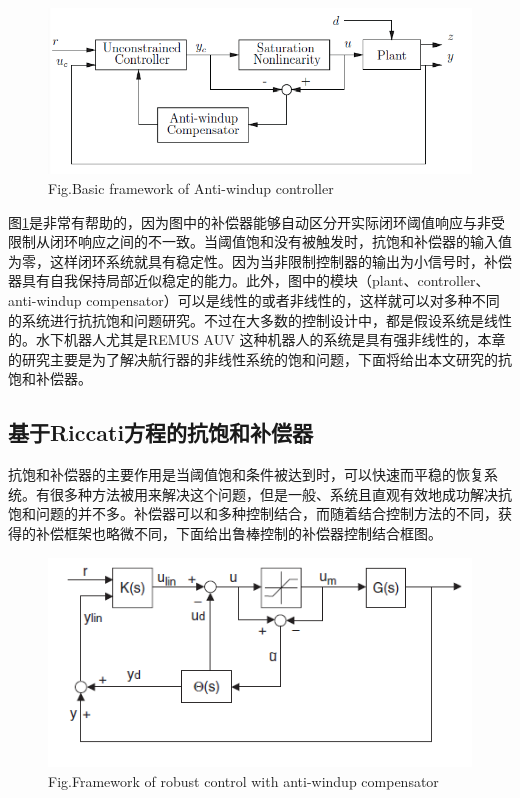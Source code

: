 \begin{figure}[!htp]
\centering
 \includegraphics[width=14cm]{figure/chap6/basic_anti-windup.png}
 \label{fig:chap6:F2}
  {Fig.}{Basic framework of Anti-windup controller}
\end{figure}

图\ref{fig:chap6:F2}是非常有帮助的，因为图中的补偿器能够自动区分开实际闭环阈值响应与非受限制从闭环响应之间的不一致。当阈值饱和没有被触发时，抗饱和补偿器的输入值为零，这样闭环系统就具有稳定性。因为当非限制控制器的输出为小信号时，补偿器具有自我保持局部近似稳定的能力。此外，图中的模块（plant、controller、anti-windup compensator）可以是线性的或者非线性的，这样就可以对多种不同的系统进行抗抗饱和问题研究。不过在大多数的控制设计中，都是假设系统是线性的。水下机器人尤其是REMUS AUV 这种机器人的系统是具有强非线性的，本章的研究主要是为了解决航行器的非线性系统的饱和问题，下面将给出本文研究的抗饱和补偿器。



\subsection{基于Riccati方程的抗饱和补偿器 }

抗饱和补偿器的主要作用是当阈值饱和条件被达到时，可以快速而平稳的恢复系统。有很多种方法被用来解决这个问题，但是一般、系统且直观有效地成功解决抗饱和问题的并不多。补偿器可以和多种控制结合，而随着结合控制方法的不同，获得的补偿框架也略微不同，下面给出鲁棒控制的补偿器控制结合框图。

\begin{figure}[!htp]
\centering
 \includegraphics[width=14cm]{figure/chap6/robust_control_AW.png}
 \label{fig:chap6:F3}
  {Fig.}{Framework of robust control with anti-windup compensator}
\end{figure}

